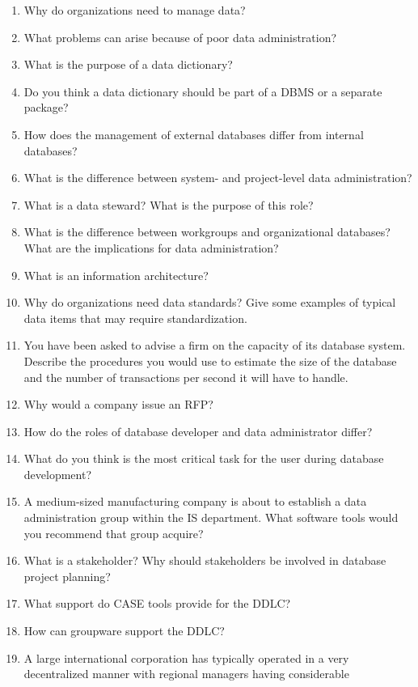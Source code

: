 \documentclass[
]{article}
\begin{document}
\begin{enumerate}
\def\labelenumi{\arabic{enumi}.}
\item
  Why do organizations need to manage data?
\item
  What problems can arise because of poor data administration?
\item
  What is the purpose of a data dictionary?
\item
  Do you think a data dictionary should be part of a DBMS or a
  separate package?
\item
  How does the management of external databases differ from internal
  databases?
\item
  What is the difference between system- and project-level data
  administration?
\item
  What is a data steward? What is the purpose of this role?
\item
  What is the difference between workgroups and organizational
  databases? What are the implications for data administration?
\item
  What is an information architecture?
\item
  Why do organizations need data standards? Give some examples of
  typical data items that may require standardization.
\item
  You have been asked to advise a firm on the capacity of its database
  system. Describe the procedures you would use to estimate the size
  of the database and the number of transactions per second it will
  have to handle.
\item
  Why would a company issue an RFP?
\item
  How do the roles of database developer and data administrator
  differ?
\item
  What do you think is the most critical task for the user during
  database development?
\item
  A medium-sized manufacturing company is about to establish a data
  administration group within the IS department. What software tools
  would you recommend that group acquire?
\item
  What is a stakeholder? Why should stakeholders be involved in
  database project planning?
\item
  What support do CASE tools provide for the DDLC?
\item
  How can groupware support the DDLC?
\item
  A large international corporation has typically operated in a very
  decentralized manner with regional managers having considerable

\end{enumerate}
\end{document}
